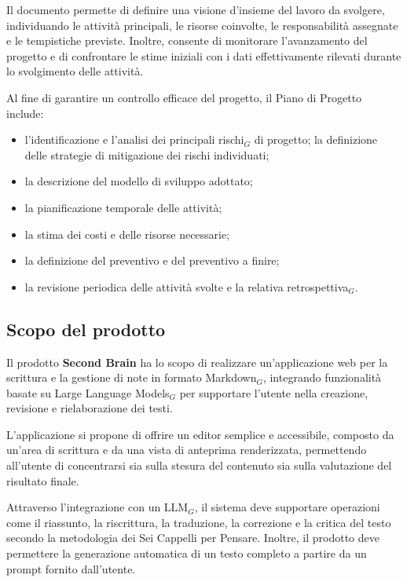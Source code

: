 \documentclass[a4paper, 10pt, colorlinks=true, linkcolor=black, urlcolor=blue, citecolor=blue, hidelinks]{article}
\begin{document}
Il documento permette di definire una visione d'insieme del lavoro da svolgere, individuando le attività principali, le risorse coinvolte, le responsabilità assegnate e le tempistiche previste. 
Inoltre, consente di monitorare l'avanzamento del progetto e di confrontare le stime iniziali con i dati effettivamente rilevati durante lo svolgimento delle attività.

Al fine di garantire un controllo efficace del progetto, il Piano di Progetto include:

\begin{itemize}
    \item l'identificazione e l'analisi dei principali rischi$_G$ di progetto; la definizione delle strategie di mitigazione dei rischi individuati;
    \item la descrizione del modello di sviluppo adottato;
    \item la pianificazione temporale delle attività;
    \item la stima dei costi e delle risorse necessarie;
    \item la definizione del preventivo e del preventivo a finire;
    \item la revisione periodica delle attività svolte e la relativa retrospettiva$_G$.
\end{itemize}

\subsection{Scopo del prodotto}

Il prodotto \textbf{Second Brain} ha lo scopo di realizzare un'applicazione web per la scrittura e la gestione di note in formato Markdown$_G$, integrando funzionalità basate su Large Language Models$_G$ per supportare l'utente nella creazione, revisione e rielaborazione dei testi.

L'applicazione si propone di offrire un editor semplice e accessibile, composto da un'area di scrittura e da una vista di anteprima renderizzata, permettendo all'utente di concentrarsi sia sulla stesura del contenuto sia sulla valutazione del risultato finale.

Attraverso l'integrazione con un LLM$_G$, il sistema deve supportare operazioni come il riassunto, la riscrittura, la traduzione, la correzione e la critica del testo secondo la metodologia dei Sei Cappelli per Pensare. Inoltre, il prodotto deve permettere la generazione automatica di un testo completo a partire da un prompt fornito dall'utente.
\end{document}
